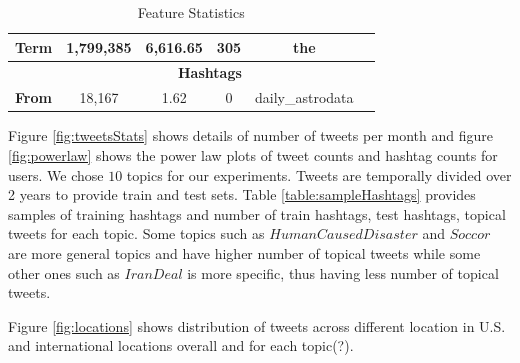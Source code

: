 \begin{table}[t!]
{{\begin{tabular}{|l|c|c|c|c|r|}
\textbf{Term}                          & 1,799,385             & 6,616.65              & 305                   & the                &                                     \\ \hline
\textbf{}                              & \multicolumn{4}{c|}{\textbf{Hashtags}}                                                        &                                     \\ \hline
\textbf{From}                          & 18,167                & 1.62                     & 0                     & daily\_astrodata      &                                     \\ \hline
\end{tabular}
}}
\caption{Feature Statistics}
\label{table:featureStatistics}
\end{table}

Figure \ref{fig:tweetsStats} shows details of number of tweets per month and figure \ref{fig:powerlaw} shows the power law plots of tweet counts and hashtag counts for users. We chose $10$ topics for our experiments. Tweets are temporally divided over 2 years to provide train and test sets. Table \ref{table:sampleHashtags} provides samples of training hashtags and number of train hashtags, test hashtags, topical tweets for each topic. Some topics such as $HumanCausedDisaster$ and $Soccor$ are more general topics and have higher number of topical tweets while some other ones such as $IranDeal$ is more specific, thus having less number of topical tweets.

Figure \ref{fig:locations} shows distribution of tweets across different location in U.S. and international locations overall and for each topic(?).

